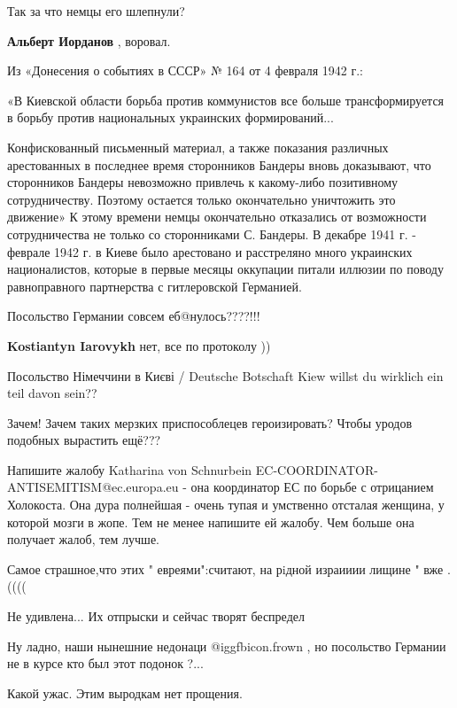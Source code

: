 \begin{itemize}
\begin{itemize}
\end{itemize} %

Так за что немцы его шлепнули?

\begin{itemize} %
\textbf{Альберт Иорданов} , воровал.


Из «Донесения о событиях в СССР» № 164 от 4 февраля 1942 г.:

«В Киевской области борьба против коммунистов все больше трансформируется в
борьбу против национальных украинских формирований...

Конфискованный письменный материал, а также показания различных арестованных в
последнее время сторонников Бандеры вновь доказывают, что сторонников Бандеры
невозможно привлечь к какому-либо позитивному сотрудничеству. Поэтому остается
только окончательно уничтожить это движение» К этому времени немцы окончательно
отказались от возможности сотрудничества не только со сторонниками С. Бандеры.
В декабре 1941 г. - феврале 1942 г. в Киеве было арестовано и расстреляно много
украинских националистов, которые в первые месяцы оккупации питали иллюзии по
поводу равноправного партнерства с гитлеровской Германией.

\end{itemize} %

Посольство Германии совсем еб@нулось????!!!

\begin{itemize} %
\textbf{Kostiantyn Iarovykh} нет, все по протоколу ))
\end{itemize} %

Посольство Німеччини в Києві / Deutsche Botschaft Kiew willst du wirklich ein teil davon sein??

Зачем! Зачем таких мерзких приспособлецев героизировать?
Чтобы уродов подобных вырастить ещё???


Напишите жалобу Katharina von Schnurbein
EC-COORDINATOR-ANTISEMITISM@ec.europa.eu - она координатор ЕС по борьбе с
отрицанием Холокоста. Она дура полнейшая - очень тупая и умственно отсталая
женщина, у которой мозги в жопе. Тем не менее напишите ей жалобу. Чем больше
она получает жалоб, тем лучше.

Самое страшное,что этих " евреями":считают, на рiдной израииии лищине " вже .((((

Не удивлена... Их отпрыски и сейчас творят беспредел

Ну ладно, наши нынешние недонаци  @igg{fbicon.frown} , но посольство Германии не в курсе кто был этот подонок ?...

Какой ужас. Этим выродкам нет прощения.


\end{itemize} %
